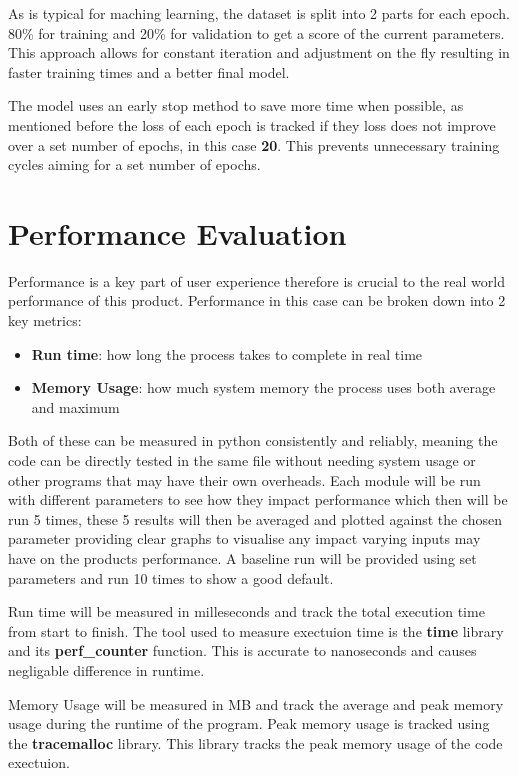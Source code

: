 \documentclass[final]{cmpreport_02}
\begin{document}
As is typical for maching learning, the dataset is split into 2 parts for each epoch. 80\% for training and 20\% for validation to get a score of the current parameters.
This approach allows for constant iteration and adjustment on the fly resulting in faster training times and a better final model.

The model uses an early stop method to save more time when possible, as mentioned before the loss of each epoch is tracked if they loss does not improve over a set number of epochs, in this case \textbf{20}.
This prevents unnecessary training cycles aiming for a set number of epochs.


\section{Performance Evaluation}

Performance is a key part of user experience therefore is crucial to the real world performance of this product.
Performance in this case can be broken down into 2 key metrics:

\begin{itemize}
	\item{\textbf{Run time}: how long the process takes to complete in real time}
	\item{\textbf{Memory Usage}: how much system memory the process uses both average and maximum}
\end{itemize}

Both of these can be measured in python consistently and reliably, meaning the code can be directly tested in the same file without needing system usage or other programs that may have their own overheads.
Each module will be run with different parameters to see how they impact performance which then will be run 5 times,
these 5 results will then be averaged and plotted against the chosen parameter providing clear graphs to visualise any impact varying inputs may have on the products performance.
A baseline run will be provided using set parameters and run 10 times to show a good default.

Run time will be measured in milleseconds and track the total execution time from start to finish.
The tool used to measure exectuion time  is the \textbf{time} library and its \textbf{perf\_counter} function.
This is accurate to nanoseconds and causes negligable difference in runtime.

Memory Usage will be measured in MB and track the average and peak memory usage during the runtime of the program.
Peak memory usage is tracked using the \textbf{tracemalloc} library.
This library tracks the peak memory usage of the code exectuion.
\end{document}
